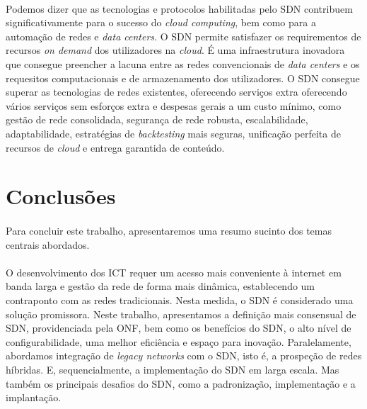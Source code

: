 \documentclass{llncs}
\begin{document}
\paragraph{}
Podemos dizer que as tecnologias e protocolos habilitadas pelo SDN contribuem significativamente para o sucesso do \textit {cloud computing}, bem como para a automação de redes e \textit {data centers}. O SDN permite satisfazer os requirementos de recursos \textit{on demand} dos utilizadores na \textit{cloud}. 
É uma infraestrutura inovadora que consegue preencher a lacuna entre as redes convencionais de \textit{data centers} e os requesitos computacionais e de armazenamento dos utilizadores.
O SDN consegue superar as tecnologias de redes existentes, oferecendo serviços extra oferecendo vários serviços sem esforços extra e despesas gerais a um custo mínimo, como gestão de rede consolidada, segurança de rede robusta, escalabilidade, adaptabilidade, estratégias de \textit {backtesting} mais seguras, unificação perfeita de recursos de \textit{cloud} e entrega garantida de conteúdo.

\section{Conclusões}
\paragraph{}
Para concluir este trabalho, apresentaremos uma resumo sucinto dos temas centrais abordados.
\paragraph{}
O desenvolvimento dos ICT requer um acesso mais conveniente à internet em banda larga e gestão da rede de forma mais dinâmica, establecendo um contraponto com as redes tradicionais. 
Nesta medida, o SDN é considerado uma solução promissora. Neste trabalho, apresentamos a definição mais consensual de SDN, providenciada pela ONF, bem como os benefícios do SDN, 
o alto nível de configurabilidade, uma melhor eficiência e espaço para inovação.
Paralelamente, abordamos integração de \textit{legacy networks} com o SDN, isto é, a prospeção de redes híbridas. 
E, sequencialmente, a implementação do SDN em larga escala.
Mas também os principais desafios do SDN, como a padronização, implementação e a implantação.

\printbibliography
\end{document}

